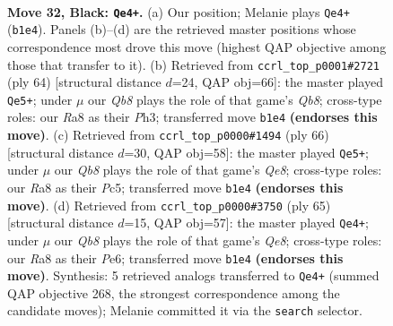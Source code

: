 \documentclass[11pt]{article}
\begin{document}
\clearpage

\begin{figure}[p]\centering
\begin{subfigure}{0.46\textwidth}\centering
\resizebox{\linewidth}{!}{%
\newchessgame
\chessboard[
  setfen={r7/2Q4p/3pkp2/8/pP6/6P1/P4PKP/1q6 b - - 0 32},
  showmover=false,
  pgfstyle=straightmove, color=movearrow, markmove={b1-e4}
]}
\caption{}
\end{subfigure}\hfill
\begin{subfigure}{0.46\textwidth}\centering
\resizebox{\linewidth}{!}{%
\newchessgame
\chessboard[
  setfen={1Q6/p4pkp/1p4p1/8/1P6/P2qP2P/5PK1/8 w - - 2 33},
  showmover=false,
  pgfstyle=straightmove, color=movearrow, markmove={b8-e5}
]}
\caption{}
\end{subfigure}
\\[4pt]
\begin{subfigure}{0.46\textwidth}\centering
\resizebox{\linewidth}{!}{%
\newchessgame
\chessboard[
  setfen={4Q3/1p3pk1/2p4p/2P5/p7/P2qP1P1/5PK1/8 w - - 5 34},
  showmover=false,
  pgfstyle=straightmove, color=movearrow, markmove={e8-e5}
]}
\caption{}
\end{subfigure}\hfill
\begin{subfigure}{0.46\textwidth}\centering
\resizebox{\linewidth}{!}{%
\newchessgame
\chessboard[
  setfen={8/Q4ppk/1p2p3/7p/1P6/6P1/P4PKP/4q3 b - - 2 33},
  showmover=false,
  pgfstyle=straightmove, color=movearrow, markmove={e1-e4}
]}
\caption{}
\end{subfigure}
\caption{\textbf{Move 32, Black: \texttt{Qe4+}.} (a) Our position; Melanie plays \texttt{Qe4+} (\texttt{b1e4}). Panels (b)--(d) are the retrieved master positions whose correspondence most drove this move (highest QAP objective among those that transfer to it). (b) Retrieved from \texttt{ccrl\_top\_p0001\#2721} (ply 64) [structural distance $d$=24, QAP obj=66]: the master played \texttt{Qe5+}; under $\mu$ our \emph{Qb8} plays the role of that game's \emph{Qb8}; cross-type roles: our \emph{R}a8 as their \emph{P}h3; transferred move \texttt{b1e4} \textbf{(endorses this move)}. (c) Retrieved from \texttt{ccrl\_top\_p0000\#1494} (ply 66) [structural distance $d$=30, QAP obj=58]: the master played \texttt{Qe5+}; under $\mu$ our \emph{Qb8} plays the role of that game's \emph{Qe8}; cross-type roles: our \emph{R}a8 as their \emph{P}c5; transferred move \texttt{b1e4} \textbf{(endorses this move)}. (d) Retrieved from \texttt{ccrl\_top\_p0000\#3750} (ply 65) [structural distance $d$=15, QAP obj=57]: the master played \texttt{Qe4+}; under $\mu$ our \emph{Qb8} plays the role of that game's \emph{Qe8}; cross-type roles: our \emph{R}a8 as their \emph{P}e6; transferred move \texttt{b1e4} \textbf{(endorses this move)}. Synthesis: 5 retrieved analogs transferred to \texttt{Qe4+} (summed QAP objective 268, the strongest correspondence among the candidate moves); Melanie committed it via the \texttt{search} selector.}
\label{fig:thought-m63}
\end{figure}
\end{document}
